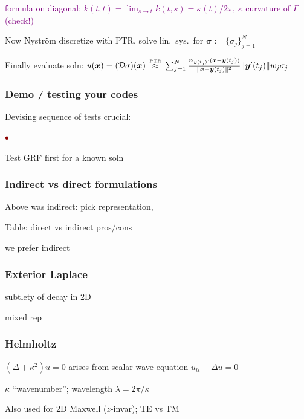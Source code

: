 \documentclass[t]{beamer}
\newcommand{\ft}[1]{\frametitle{#1}}
\newcommand{\mbf}[1]{{\bm #1}}           %
\newcommand{\tbox}[1]{{\mbox{\tiny #1}}}
\newcommand{\com}[1]{{\scriptsize \textcolor{purple}{#1}}}      %
\newcommand{\sg}{\vspace{1ex}}
\newcommand{\rb}{\ensuremath{\textcolor{darkred}{\bullet\;}}\ }
\newcommand{\xx}{\mbf{x}}
\newcommand{\yy}{\mbf{y}}
\newcommand{\nn}{\mbf{n}}
\newcommand{\Drep}{{\cal D}}
\begin{document}
\begin{noframe}
\hfill \com{formula on diagonal: $k(t,t) = \lim_{s\to t} k(t,s) = \kappa(t)/2\pi$, \; $\kappa$ curvature of $\Gamma$ \; (check!)}


\pause
\sg

Now Nystr\"om discretize with PTR, solve lin.\ sys.\ for $\bm\sigma:=\{\sigma_j\}_{j=1}^N$

Finally evaluate soln: $u(\xx) = (\Drep\sigma)(\xx)
\,\stackrel{\tbox{PTR}}{\approx}\,
\sum_{j=1}^N
\frac{\nn_{\yy(t_j)}\cdot(\xx-\yy(t_j))}{\|\xx-\yy(t_j)\|^2}\|\yy'(t_j)\|w_j \sigma_j$

    
\end{noframe}

\begin{frame}\ft{Demo / testing your codes}



  

  Devising sequence of tests crucial:
  
  \rb 
  
Test GRF first for a known soln




\end{frame}

\begin{frame}\ft{Indirect vs direct formulations}

 Above was indirect: pick representation, 
  
  Table: direct vs indirect pros/cons
  
we prefer indirect

\end{frame}

\begin{frame}\ft{Exterior Laplace}

subtlety of decay in 2D

mixed rep

\end{frame}

\begin{frame}\ft{Helmholtz}

  $(\Delta + \kappa^2)u = 0$ arises from scalar wave equation $u_{tt}- \Delta u = 0$

  $\kappa$ ``wavenumber''; wavelength $\lambda = 2\pi/\kappa$
  
  Also used for 2D Maxwell ($z$-invar); TE vs TM

  

  

  
\end{frame}
\end{document}
